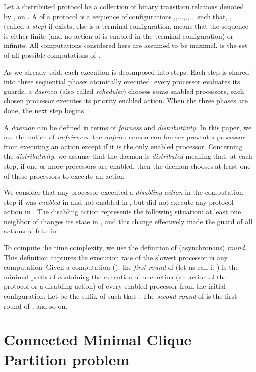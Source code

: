\documentclass[11pt,letterpaper,onecolumn]{article}
\begin{document}
Let a distributed protocol  be a collection of binary transition relations denoted by , on . A  of a protocol  is a  sequence of configurations ,,...,,,... such that, ,  (called a {\em step}) if  exists, else  is a terminal configuration.  means that the sequence is either finite (and no action of  is enabled in the terminal configuration) or infinite. All computations considered here are assumed to be maximal.  is the set of all possible computations of .

As we already said, each execution is decomposed into steps. Each step is shared into three sequential phases atomically executed:  every processor evaluates its guards,  a {\em daemon} (also called {\em scheduler}) chooses some enabled processors,  each chosen processor executes its priority enabled action. When the three phases are done, the next step begins. 

A {\em daemon} can be defined in terms of {\em fairness} and {\em distributivity}. In this paper, we use the notion of {\em unfairness}: the {\em unfair} daemon can forever prevent a processor from executing an action except if it is the only enabled processor. Concerning the {\em distributivity}, we assume that the daemon is {\em distributed} meaning that, at each step, if one or more processors are enabled, then the daemon chooses at least one of these processors to execute an action.

We consider that any processor  executed a {\em disabling} {\em action} in the computation step  if  was {\em enabled} in  and not enabled in , but did not execute any protocol action in . The disabling action represents the following situation: at least one neighbor of  changes its state in , and this change effectively made the guard of all actions of  false in .

To compute the time complexity, we use the definition of (asynchronous) \emph{round}. This definition captures the execution rate of the slowest processor in any computation. Given a computation  (), the \emph{first round} of  (let us call it ) is the minimal prefix of  containing the execution of one action (an action of the protocol or a disabling action) of every enabled processor from the initial configuration.  Let  be the suffix of  such that . The \emph{second round} of  is the first round of , and so on.


\section{Connected Minimal Clique Partition problem}
\label{sec:cmcp}
\end{document}
